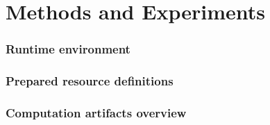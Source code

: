 \chapter{Methods and Experiments}

\subsection{Runtime environment}

\subsection{Prepared resource definitions}

\subsection{Computation artifacts overview}